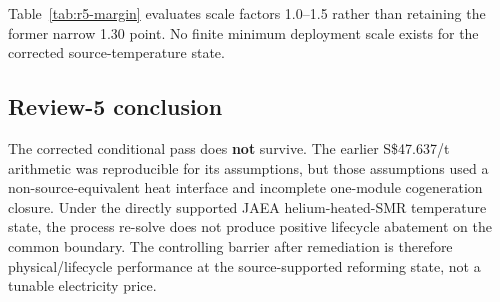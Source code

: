 \begin{table}[htbp]\centering\tiny
\caption{Review-5-remediated deployment scenarios. The former S\$47.637/t conditional pass is superseded.}
\label{tab:r5-results}
\end{table}

Table~\ref{tab:r5-margin} evaluates scale factors 1.0--1.5 rather than retaining the former narrow 1.30 point. No finite minimum deployment scale exists for the corrected source-temperature state.

\begin{table}[htbp]\centering\scriptsize
\caption{Scale sensitivity after the JAEA source-temperature process re-solve.}
\label{tab:r5-margin}
\end{table}

\subsection{Review-5 conclusion}
The corrected conditional pass does \textbf{not} survive. The earlier S\$47.637/t arithmetic was reproducible for its assumptions, but those assumptions used a non-source-equivalent heat interface and incomplete one-module cogeneration closure. Under the directly supported JAEA helium-heated-SMR temperature state, the process re-solve does not produce positive lifecycle abatement on the common boundary. The controlling barrier after remediation is therefore physical/lifecycle performance at the source-supported reforming state, not a tunable electricity price.